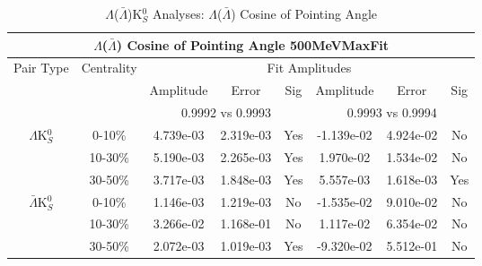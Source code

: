 \documentclass[../AnalysisNoteJBuxton.tex]{subfiles}
\begin{document}
\begin{table}
 \centering
 \begin{tabular}{|c|c|c|c|c||c|c|c|}
  \multicolumn{8}{c}{$\Lambda$($\bar{\Lambda}$) Cosine of Pointing Angle 500MeVMaxFit} \\
  \hline
  \multirow{3}{*}{Pair Type} & \multirow{3}{*}{Centrality} & \multicolumn{6}{c|}{Fit Amplitudes} \\
  \cline{3-8}
   & & Amplitude & Error & Sig & Amplitude & Error & Sig \\  
  \cline{3-8}
   & & \multicolumn{3}{c||}{0.9992 vs 0.9993} & \multicolumn{3}{c|}{0.9993 vs 0.9994} \\  
  \hline  
  \multirow{3}{*}{$\Lambda$K$^{0}_{S}$}  
   &  0-10\% & 4.739e-03 & 2.319e-03 & Yes & -1.139e-02 & 4.924e-02 & No \\
   & 10-30\% & 5.190e-03 & 2.265e-03 & Yes & 1.970e-02 & 1.534e-02 & No \\
   & 30-50\% & 3.717e-03 & 1.848e-03 & Yes & 5.557e-03 & 1.618e-03 & Yes \\
  \hline  
  \multirow{3}{*}{$\bar{\Lambda}$K$^{0}_{S}$}  
   &  0-10\% & 1.146e-03 & 1.219e-03 & No & -1.535e-02 & 9.010e-02 & No \\
   & 10-30\% & 3.266e-02 & 1.168e-01 & No & 1.117e-02 & 6.354e-02 & No \\
   & 30-50\% & 2.072e-03 & 1.019e-03 & Yes & -9.320e-02 & 5.512e-01 & No \\
  \hline
 \end{tabular}
 \caption{$\Lambda$($\bar{\Lambda}$)K$^{0}_{S}$ Analyses: $\Lambda$($\bar{\Lambda}$) Cosine of Pointing Angle}
 \label{tab:LamCosPointingAngleLamK0_500MeVMaxFit}
\end{table}
\end{document}
